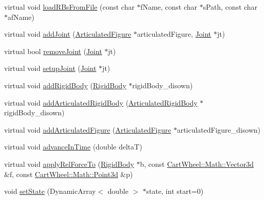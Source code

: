 \begin{DoxyCompactItemize}
\item 
virtual void \hyperlink{classCartWheel_1_1Physics_1_1ODEWorld_aecf3cd605875b12cdc25edd660ab3085}{loadRBsFromFile} (const char $\ast$fName, const char $\ast$sPath, const char $\ast$afName)
\item 
virtual void \hyperlink{classCartWheel_1_1Physics_1_1ODEWorld_afb5156756a0a15cc5e535f1ba405324a}{addJoint} (\hyperlink{classCartWheel_1_1Physics_1_1ArticulatedFigure}{ArticulatedFigure} $\ast$articulatedFigure, \hyperlink{classCartWheel_1_1Physics_1_1Joint}{Joint} $\ast$jt)
\item 
virtual bool \hyperlink{classCartWheel_1_1Physics_1_1ODEWorld_a49a6eb9fccf6d96fb57ea626431ce7a4}{removeJoint} (\hyperlink{classCartWheel_1_1Physics_1_1Joint}{Joint} $\ast$jt)
\item 
virtual void \hyperlink{classCartWheel_1_1Physics_1_1ODEWorld_ae1fb3953c58a1fe62e1ecc2ca4d7c68e}{setupJoint} (\hyperlink{classCartWheel_1_1Physics_1_1Joint}{Joint} $\ast$jt)
\item 
virtual void \hyperlink{classCartWheel_1_1Physics_1_1ODEWorld_a908e6c943e0f464135695aa4942c93d7}{addRigidBody} (\hyperlink{classCartWheel_1_1Physics_1_1RigidBody}{RigidBody} $\ast$rigidBody\_\-disown)
\item 
virtual void \hyperlink{classCartWheel_1_1Physics_1_1ODEWorld_aa68b2283efade199c6d444672afea1eb}{addArticulatedRigidBody} (\hyperlink{classCartWheel_1_1Physics_1_1ArticulatedRigidBody}{ArticulatedRigidBody} $\ast$rigidBody\_\-disown)
\item 
virtual void \hyperlink{classCartWheel_1_1Physics_1_1ODEWorld_a092b6f5911b2241c63927005b71fdf1d}{addArticulatedFigure} (\hyperlink{classCartWheel_1_1Physics_1_1ArticulatedFigure}{ArticulatedFigure} $\ast$articulatedFigure\_\-disown)
\item 
virtual void \hyperlink{classCartWheel_1_1Physics_1_1ODEWorld_af4478f856562a7412583a788f22a7422}{advanceInTime} (double deltaT)
\item 
virtual void \hyperlink{classCartWheel_1_1Physics_1_1ODEWorld_a3403766a4fa655a7b2d0df7a409a990e}{applyRelForceTo} (\hyperlink{classCartWheel_1_1Physics_1_1RigidBody}{RigidBody} $\ast$b, const \hyperlink{classCartWheel_1_1Math_1_1Vector3d}{CartWheel::Math::Vector3d} \&f, const \hyperlink{classCartWheel_1_1Math_1_1Point3d}{CartWheel::Math::Point3d} \&p)
\item 
void \hyperlink{classCartWheel_1_1Physics_1_1ODEWorld_ad5f89cdc454b093096825455db1fb294}{setState} (DynamicArray$<$ double $>$ $\ast$state, int start=0)
\item 

\end{DoxyCompactItemize}
